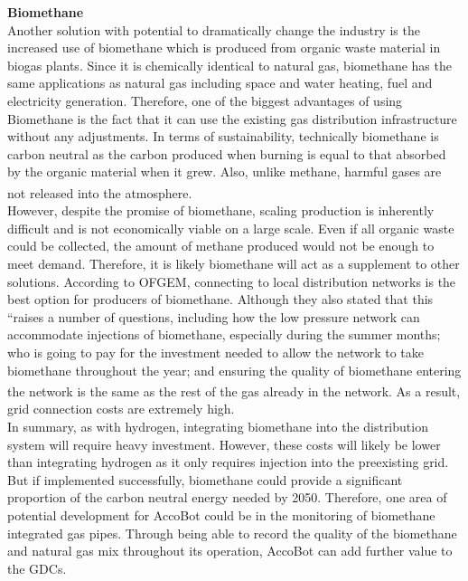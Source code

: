 \documentclass[11pt]{article}		%
\newcommand{\supercite}[1]{\textsuperscript{\cite{#1}}}		%
\begin{document}
            \textbf{Biomethane} 
            \\
            Another solution with potential to dramatically change the industry is the increased use of biomethane which is produced from organic waste material in biogas plants. Since it is chemically identical to natural gas, biomethane has the same applications as natural gas including space and water heating, fuel and electricity generation. Therefore, one of the biggest advantages of using Biomethane is the fact that it can use the existing gas distribution infrastructure without any adjustments. In terms of sustainability, technically biomethane is carbon neutral as the carbon produced when burning is equal to that absorbed by the organic material when it grew. Also, unlike methane, harmful gases are not released into the atmosphere\supercite{biomethanead}.
            \\
    	    \hspace*{2ex}However, despite the promise of biomethane, scaling production is inherently difficult and is not economically viable on a large scale. Even if all organic waste could be collected, the amount of methane produced would not be enough to meet demand. Therefore, it is likely biomethane will act as a supplement to other solutions. According to OFGEM, connecting to local distribution networks is the best option for producers of biomethane. Although they also stated that this “raises a number of questions, including how the low pressure network can accommodate injections of biomethane, especially during the summer months; who is going to pay for the investment needed to allow the network to take biomethane throughout the year; and ensuring the quality of biomethane entering the network is the same as the rest of the gas already in the network\supercite{biomethaneof}. As a result, grid connection costs are extremely high.
    	    \\
        	\hspace*{2ex}In summary, as with hydrogen, integrating biomethane into the distribution system will require heavy investment. However, these costs will likely be lower than integrating hydrogen as it only requires injection into the preexisting grid. But if implemented successfully, biomethane could provide a significant proportion of the carbon neutral energy needed by 2050. Therefore, one area of potential development for AccoBot could be in the monitoring of biomethane integrated gas pipes. Through being able to record the quality of the biomethane and natural gas mix throughout its operation, AccoBot can add further value to the GDCs. 
    
\end{document}
